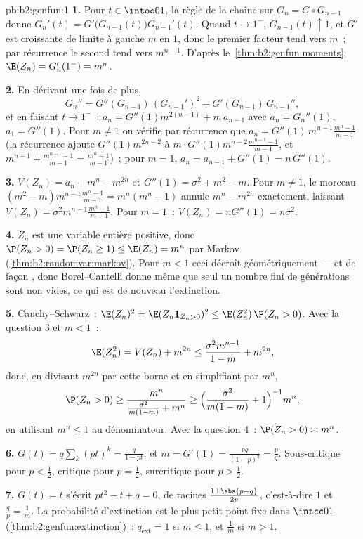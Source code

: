 \begin{solution}{pb:b2:genfun:1}
\textbf{1.} Pour $t \in \intoo01$, la règle de la chaîne sur $G_n = G
\circ G_{n-1}$ donne $G_n'(t) =
G'\bigl(G_{n-1}(t)\bigr)G_{n-1}'(t)$. Quand $t \to 1^-$,
$G_{n-1}(t) \uparrow 1$, et $G'$ est croissante de
limite à gauche $m$ en $1$, donc le premier facteur tend vers $m$~; par
récurrence le second tend vers $m^{n-1}$. D'après le~\cref{thm:b2:genfun:moments}, $\E(Z_n) = G_n'(1^-) = m^n$.

\textbf{2.} En dérivant une fois de plus,
\[
G_n'' = G''(G_{n-1})\,(G_{n-1}')^2 +
G'(G_{n-1})\,G_{n-1}'',
\]
et en faisant $t \to 1^-$~: $a_n = G''(1)m^{2(n-1)} + m\,
a_{n-1}$ avec $a_n = G_n''(1)$, $a_1 = G''(1)$. Pour $m \neq
1$ on vérifie par récurrence que $a_n = G''(1)\,m^{n-1}
\frac{m^n - 1}{m - 1}$ (la récurrence ajoute $G''(1)m^{2n-2}$
à $m\cdot G''(1)m^{n-2}\frac{m^{n-1}-1}{m-1}$, et
$m^{n-1} + \frac{m^{n-1}-1}{m-1} = \frac{m^n - 1}{m-1}$)~;
pour $m = 1$, $a_n = a_{n-1} + G''(1) = n\,G''(1)$.

\textbf{3.} $V(Z_n) = a_n + m^n - m^{2n}$ et $G''(1) =
\sigma^2 + m^2 - m$. Pour $m \neq 1$, le morceau $(m^2 -
m)m^{n-1}\frac{m^n-1}{m-1} = m^n(m^n - 1)$ annule $m^n -
m^{2n}$ exactement, laissant $V(Z_n) =
\sigma^2m^{n-1}\frac{m^n-1}{m-1}$. Pour $m = 1$~: $V(Z_n) =
nG''(1) = n\sigma^2$.

\textbf{4.} $Z_n$ est une variable entière positive, donc
$\P(Z_n > 0) = \P(Z_n \geq 1) \leq \E(Z_n) = m^n$ par Markov
(\cref{thm:b2:randomvar:markov}). Pour $m < 1$ ceci décroît
géométriquement --- et de façon , donc Borel--Cantelli donne
même que seul un nombre fini de générations sont non vides, ce qui est
de nouveau l'extinction.

\textbf{5.} Cauchy--Schwarz~: $\E(Z_n)^2 = \E(Z_n\mathbf
1_{Z_n>0})^2 \leq \E(Z_n^2)\,\P(Z_n > 0)$. Avec la question 3
et $m < 1$~:
\[
\E(Z_n^2) = V(Z_n) + m^{2n}
\leq \frac{\sigma^2m^{n-1}}{1-m} + m^{2n},
\]
donc, en divisant $m^{2n}$ par cette borne et en simplifiant par
$m^n$,
\[
\P(Z_n > 0) \geq \frac{m^n}{\frac{\sigma^2}{m(1-m)} + m^n}
\geq \Bigl(\frac{\sigma^2}{m(1-m)} + 1\Bigr)^{-1}m^n ,
\]
en utilisant $m^n \leq 1$ au dénominateur. Avec la question 4~:
$\P(Z_n > 0) \asymp m^n$.

\textbf{6.} $G(t) = q\sum_k(pt)^k = \frac{q}{1 - pt}$, et $m
= G'(1) = \frac{pq}{(1-p)^2} = \frac pq$. Sous-critique pour $p
< \frac12$, critique pour $p = \frac12$, surcritique pour $p
> \frac12$.

\textbf{7.} $G(t) = t$ s'écrit $pt^2 - t + q = 0$, de racines
$\frac{1 \pm \abs{p - q}}{2p}$, c'est-à-dire $1$ et $\frac qp =
\frac1m$. La probabilité d'extinction est le plus petit point
fixe dans $\intcc01$ (\cref{thm:b2:genfun:extinction})~:
$q_{\mathrm{ext}} = 1$ si $m \leq 1$, et $\frac1m$ si $m >
1$.


\end{solution}
